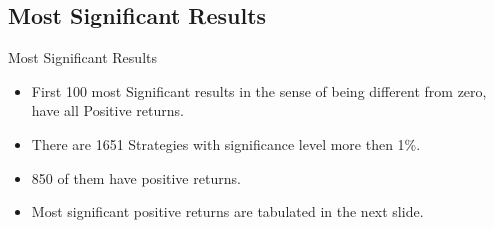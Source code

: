 \documentclass[aspectratio=169]{beamer}
\begin{document}
\subsection{Most Significant Results}

	\begin{frame}{Most Significant Results}
			\begin{itemize}
				\item First 100 most Significant results in the sense of being different from zero, have all Positive returns.
				\item There are 1651 Strategies with significance level more then 1\%.
				\item 850 of them have positive returns.
				\item Most significant positive returns are tabulated in the next slide.
			\end{itemize}
	\end{frame}
\end{document}

